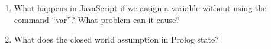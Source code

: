\begin{enumerate}
\item What happens in JavaScript if we assign a variable without using the command ``var''? What problem can it cause? 
\vspace{5cm}

\item What does the closed world assumption in Prolog state?


\end{enumerate}